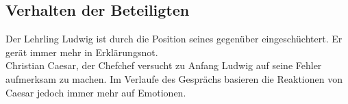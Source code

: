 \subsection*{Verhalten der Beteiligten}
Der Lehrling Ludwig ist durch die Position seines gegenüber eingeschüchtert. Er gerät immer mehr in Erklärungsnot.\\
Christian Caesar, der Chefchef versucht zu Anfang Ludwig auf seine Fehler aufmerksam zu machen. Im Verlaufe des Gesprächs basieren die Reaktionen von Caesar jedoch immer mehr auf Emotionen.\\

